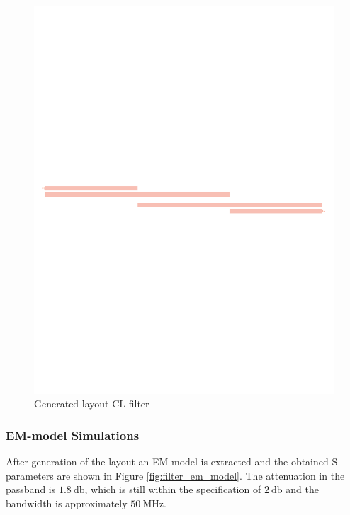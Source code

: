 \documentclass[a4paper]{article}        %
\begin{document}
			\begin{figure}[H]
			\centering
				\includegraphics[width=\textwidth]{fig/Filter/2nd_order/layout.pdf}
				\caption{Generated layout CL filter}
				\label{fig:filter_layout}
			\end{figure}
		
		\subsubsection{EM-model Simulations}
			After generation of the layout an EM-model is extracted and the obtained S-parameters are shown in Figure \ref{fig:filter_em_model}. The attenuation in the passband is $\SI{1.8}{\decibel}$, which is still within the specification of $\SI{2}{\decibel}$ and the bandwidth is approximately $\SI{50}{\mega\hertz}$.
\end{document}
